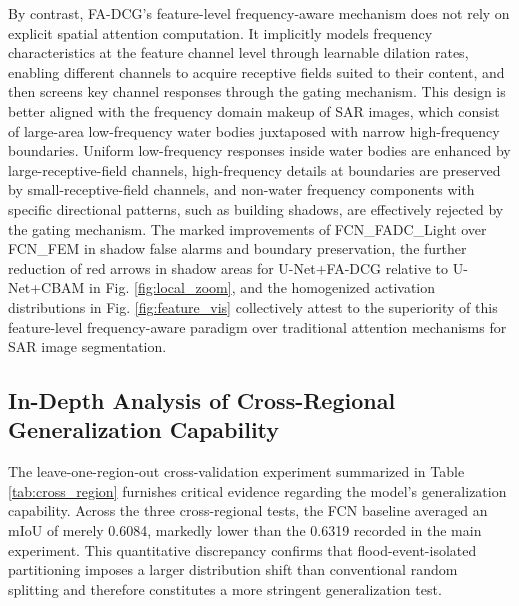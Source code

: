 \documentclass[lettersize,journal]{IEEEtran}
\begin{document}
By contrast, FA-DCG's feature-level frequency-aware mechanism does not rely on explicit spatial attention computation. It implicitly models frequency characteristics at the feature channel level through learnable dilation rates, enabling different channels to acquire receptive fields suited to their content, and then screens key channel responses through the gating mechanism. This design is better aligned with the frequency domain makeup of SAR images, which consist of large-area low-frequency water bodies juxtaposed with narrow high-frequency boundaries. Uniform low-frequency responses inside water bodies are enhanced by large-receptive-field channels, high-frequency details at boundaries are preserved by small-receptive-field channels, and non-water frequency components with specific directional patterns, such as building shadows, are effectively rejected by the gating mechanism. The marked improvements of FCN\_FADC\_Light over FCN\_FEM in shadow false alarms and boundary preservation, the further reduction of red arrows in shadow areas for U-Net+FA-DCG relative to U-Net+CBAM in Fig. \ref{fig:local_zoom}, and the homogenized activation distributions in Fig. \ref{fig:feature_vis} collectively attest to the superiority of this feature-level frequency-aware paradigm over traditional attention mechanisms for SAR image segmentation.

\subsection{In-Depth Analysis of Cross-Regional Generalization Capability}

The leave-one-region-out cross-validation experiment summarized in Table \ref{tab:cross_region} furnishes critical evidence regarding the model's generalization capability. Across the three cross-regional tests, the FCN baseline averaged an mIoU of merely 0.6084, markedly lower than the 0.6319 recorded in the main experiment. This quantitative discrepancy confirms that flood-event-isolated partitioning imposes a larger distribution shift than conventional random splitting and therefore constitutes a more stringent generalization test.
\end{document}

